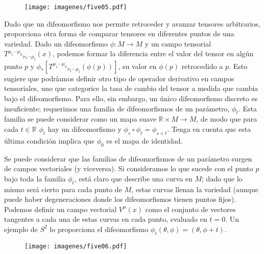 \documentclass[11pt,b5paper,openany,twoside]{book}
\newcommand{\R}{\mathbb{R}}
\begin{document}
\begin{figure}
\centering
\texttt{[image: imagenes/five05.pdf]}
\end{figure}

Dado que un difeomorfismo nos permite retroceder y avanzar tensores arbitrarios, proporciona otra forma de comparar tensores en diferentes puntos de una variedad.
Dado un difeomorfismo $\phi:M\rightarrow M$ y un campo tensorial $T^{\mu_1 \cdots \mu_k}{}_{\nu_1 \cdots \mu_l}(x)$, podemos formar la diferencia entre el valor del tensor en algún punto $p$ y $\phi_*[T^{\mu_1 \cdots \mu_k}{}_{\nu_1 \cdots \mu_l}(\phi(p))]$, su valor en $\phi(p)$ retrocedido a $p$.
Esto sugiere que podríamos definir otro tipo de operador derivativo en campos tensoriales, uno que categorice la tasa de cambio del tensor a medida que cambia bajo el difeomorfismo.
Para ello, sin embargo, un único difeomorfismo discreto es insuficiente; requerimos una familia de difeomorfismos de un parámetro, $\phi_t$.
Esta familia se puede considerar como un mapa suave $\R\times M\rightarrow M$, de modo que para cada $t\in\R$ $\phi_t$ hay un difeomorfismo y $\phi_s\circ\phi_t=\phi_{s+t}$.
Tenga en cuenta que esta última condición implica que $\phi_0$ es el mapa de identidad.

Se puede considerar que las familias de difeomorfismos de un parámetro surgen de campos vectoriales (y viceversa).
Si consideramos lo que sucede con el punto $p$ bajo toda la familia $\phi_t$, está claro que describe una curva en $M$; dado que lo mismo será cierto para cada punto de $M$, estas curvas llenan la variedad (aunque puede haber degeneraciones donde los difeomorfismos tienen puntos fijos).
Podemos definir un campo vectorial $V^\mu(x)$ como el conjunto de vectores tangentes a cada una de estas curvas en cada punto, evaluado en $t=0$.
Un ejemplo de $S^2$ lo proporciona el difeomorfismo $\phi_t(\theta,\phi)=(\theta,\phi+t)$.

\begin{figure}
\centering
\texttt{[image: imagenes/five06.pdf]}
\end{figure}
\end{document}
